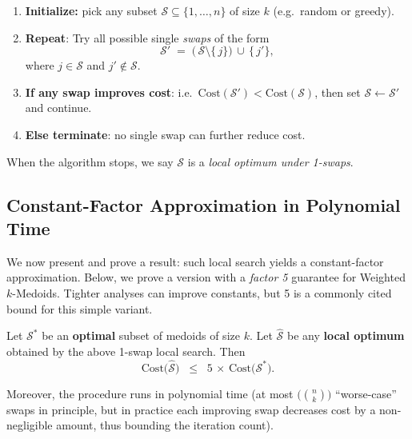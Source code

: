 \begin{enumerate}
\item \textbf{Initialize:} pick any subset $\mathcal{S}\subseteq\{1,\dots,n\}$ of size $k$ (e.g.\ random or greedy).
\item \textbf{Repeat}: Try all possible single \emph{swaps} of the form
\[
   \mathcal{S}' 
   \;=\; 
   \bigl(\,\mathcal{S}\setminus\{\,j\}\bigr)
   \,\cup\,
   \{\,j'\},
\]
where $j\in\mathcal{S}$ and $j'\notin\mathcal{S}$.  
\item \textbf{If any swap improves cost}: i.e.\ $\mathrm{Cost}(\mathcal{S}') < \mathrm{Cost}(\mathcal{S})$, then set $\mathcal{S}\leftarrow \mathcal{S}'$ and continue.
\item \textbf{Else terminate}: no single swap can further reduce cost.
\end{enumerate}

When the algorithm stops, we say $\mathcal{S}$ is a \emph{local optimum under 1-swaps}.

\subsection{Constant-Factor Approximation in Polynomial Time}

We now present and prove a result: such local search yields a constant-factor approximation.  Below, we prove a version with a \emph{factor 5} guarantee for Weighted $k$-Medoids.  Tighter analyses can improve constants, but 5 is a commonly cited bound for this simple variant.


\begin{theorem}
\label{thm:local_search_kmedoids}
Let $\mathcal{S}^*$ be an \textbf{optimal} subset of medoids of size $k$. Let $\widehat{\mathcal{S}}$ be any \textbf{local optimum} obtained by the above 1-swap local search. Then
\begin{equation}
    \mathrm{Cost}\bigl(\widehat{\mathcal{S}}\bigr)
  \;\;\le\;\;
  5
  \,\times\,
  \mathrm{Cost}\bigl(\mathcal{S}^*\bigr).
\end{equation}

Moreover, the procedure runs in polynomial time (at most $\bigl(\binom{n}{k}\bigr)$ “worse-case” swaps in principle, but in practice each improving swap decreases cost by a non-negligible amount, thus bounding the iteration count).
\end{theorem}


